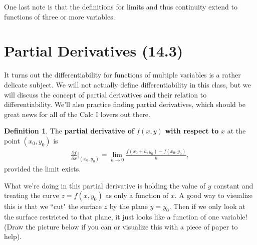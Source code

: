 \documentclass[12pt, letter]{article}
\theoremstyle{plain}
\numberwithin{theorem}{section}
\theoremstyle{definition}
\newtheorem{definition}[theorem]{Definition}
\begin{document}
\bigskip

\hrulefill

\bigskip

One last note is that the definitions for limits and thus continuity extend to functions of three or more variables.

\newpage


\section{Partial Derivatives (14.3)}

It turns out the differentiability for functions of multiple variables is a rather delicate subject. We will not actually define differentiability in this class, but we will discuss the concept of partial derivatives and their relation to differentiability. We'll also practice finding partial derivatives, which should be great news for all of the Calc I lovers out there.

\bigskip

\begin{definition}
The \textbf{partial derivative of} $f(x,y)$ \textbf{with respect to} $x$ at the point $(x_0,y_0)$ is
\begin{align*}
\frac{\partial f}{\partial x} \bigg\rvert_{(x_0,y_0)} = \lim_{h\to 0} \frac{f(x_0+h,y_0)-f(x_0,y_0)}{h},
\end{align*}
provided the limit exists.
\end{definition}

\bigskip

What we're doing in this partial derivative is holding the value of $y$ constant and treating the curve $z=f(x,y_0)$ as only a function of $x$. A good way to visualize this is that we ``cut" the surface $z$ by the plane $y=y_0$. Then if we only look at the surface restricted to that plane, it just looks like a function of one variable! (Draw the picture below if you can or visualize this with a piece of paper to help).

\bigskip
\end{document}
